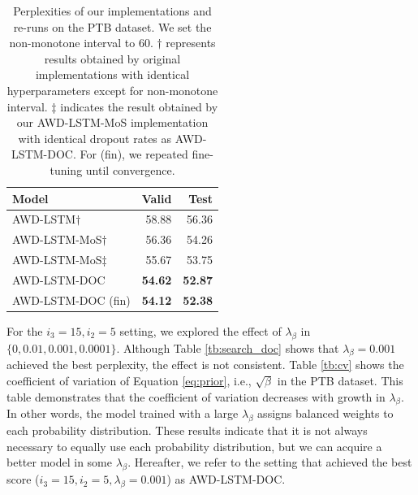 \documentclass[11pt,a4paper]{article}
\begin{document}
\begin{table}[!t]
  \centering
  \small
  \begin{tabular}{| l | r r |} \hline
  Model & Valid & Test \\ \hline
  AWD-LSTM$\dagger$ & 58.88 & 56.36 \\
  AWD-LSTM-MoS$\dagger$ & 56.36 & 54.26 \\
  AWD-LSTM-MoS$\ddagger$ & 55.67 & 53.75 \\
  AWD-LSTM-DOC & {\bf 54.62} & {\bf 52.87} \\
  AWD-LSTM-DOC (fin) & {\bf 54.12} & {\bf 52.38} \\ \hline
  \end{tabular}
  \caption{Perplexities of our implementations and re-runs on the PTB dataset. We set the non-monotone interval to 60. $\dagger$ represents results obtained by original implementations with identical hyperparameters except for non-monotone interval. $\ddagger$ indicates the result obtained by our AWD-LSTM-MoS implementation with identical dropout rates as AWD-LSTM-DOC. For (fin), we repeated fine-tuning until convergence.\label{tb:compare_awdlstm}}
\end{table}


For the $i_{3}=15, i_{2}=5$ setting, we explored the effect of $\lambda_{\beta}$ in $\{0, 0.01, 0.001, 0.0001\}$.
Although Table \ref{tb:search_doc} shows that $\lambda_{\beta} = 0.001$ achieved the best perplexity, the effect is not consistent.
Table \ref{tb:cv} shows the coefficient of variation of Equation \ref{eq:prior}, i.e., $\sqrt{\beta}$ in the PTB dataset.
This table demonstrates that the coefficient of variation decreases with growth in $\lambda_{\beta}$.
In other words, the model trained with a large $\lambda_{\beta}$ assigns balanced weights to each probability distribution.
These results indicate that it is not always necessary to equally use each probability distribution, but we can acquire a better model in some $\lambda_{\beta}$.
Hereafter, we refer to the setting that achieved the best score ($i_{3}=15, i_{2}=5, \lambda_{\beta}=0.001$) as AWD-LSTM-DOC.
\end{document}
